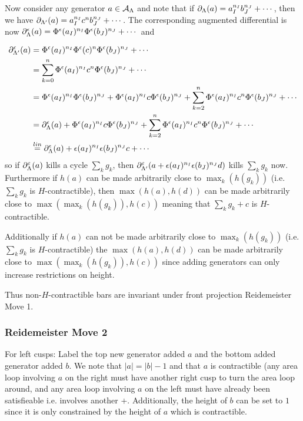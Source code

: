 \documentclass[11pt,oneside]{amsart}
\begin{document}
Now consider any generator $a\in \mathcal{A}_{\Lambda} $ and note that if $\partial_\Lambda(a)=a_I^{n_I} b_J^{n_J}+\cdots$, then we have $\partial_{\Lambda'}(a)=a_I^{n_I}c^n b_J^{n_J}+\cdots$. The corresponding augmented differential is now $\partial_{\Lambda}^\epsilon(a)=\Phi^\epsilon(a_I)^{n_I}\Phi^\epsilon(b_J)^{n_J}+\cdots$ and 

\begin{align*}
\partial_{\Lambda'}^\epsilon(a)&=\Phi^\epsilon(a_I)^{n_I}\Phi^\epsilon(c)^n\Phi^\epsilon(b_J)^{n_J}+\cdots\\
&=\sum_{k=0}^n\Phi^\epsilon(a_I)^{n_I}c^n\Phi^\epsilon(b_J)^{n_J}+\cdots\\
&=\Phi^\epsilon(a_I)^{n_I}\Phi^\epsilon(b_J)^{n_J}+\Phi^\epsilon(a_I)^{n_I}c\Phi^\epsilon(b_J)^{n_J}+\sum_{k=2}^n\Phi^\epsilon(a_I)^{n_I}c^n\Phi^\epsilon(b_J)^{n_J}+\cdots\\
&=\partial_\Lambda^\epsilon(a)+\Phi^\epsilon(a_I)^{n_I}c\Phi^\epsilon(b_J)^{n_J}+\sum_{k=2}^n\Phi^\epsilon(a_I)^{n_I}c^n\Phi^\epsilon(b_J)^{n_J}+\cdots\\
&\overset{lin}{=}\partial_\Lambda^\epsilon(a)+\epsilon(a_I)^{n_I}\epsilon(b_J)^{n_J}c+\cdots\\
\end{align*}
so if $\partial^\varepsilon_\Lambda(a)$ kills a cycle $\sum_k g_k$, then $\partial^\varepsilon_{\Lambda'}(a+\epsilon(a_I)^{n_I}\epsilon(b_J)^{n_J}d)$ kills $\sum_k g_k$ now. Furthermore if $h(a)$ can be made arbitrarily close to $\max_k(h(g_k))$ (i.e. $\sum_k g_k$ is $H$-contractible), then $\max(h(a),h(d))$ can be made arbitrarily close to $\max(\max_k(h(g_k)), h(c))$ meaning that $\sum_k g_k + c$ is $H$-contractible. 

Additionally if $h(a)$ can not be made arbitrarily close to $\max_k(h(g_k))$ (i.e. $\sum_k g_k$ is $H$-contractible) the $\max(h(a),h(d))$ can be made arbitrarily close to $\max(\max_k(h(g_k)), h(c))$ since adding generators can only increase restrictions on height.

Thus non-$H$-contractible bars are invariant under front projection Reidemeister Move 1.

\subsubsection{Reidemeister Move 2}

For left cusps: Label the top new generator added $a$ and the bottom added generator added $b$. We note that $|a| = |b|  - 1$ and that $a$ is contractible (any area loop involving $a$ on the right must have another right cusp to turn the area loop around, and any area loop involving $a$ on the left must have already been satisfieable i.e. involves another $+$. Additionally, the height of $b$ can be set to $1$ since it is only constrained by the height of $a$ which is contractible. 
\end{document}
